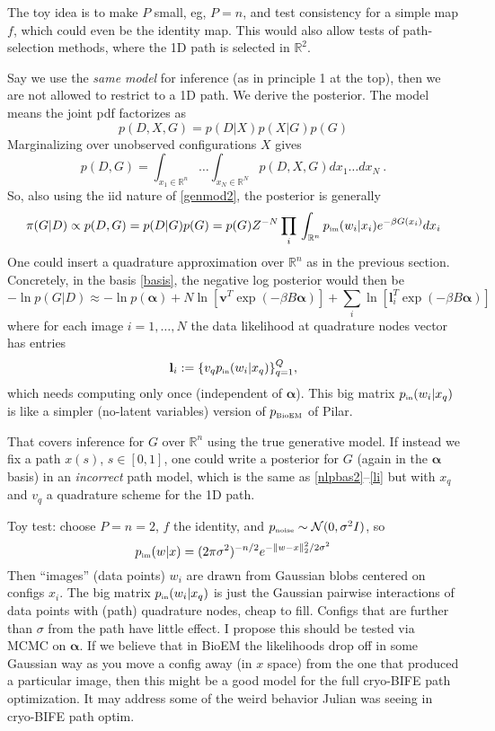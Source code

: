 \documentclass[10pt]{article}
\newcommand{\be}{\begin{equation}}
\newcommand{\ee}{\end{equation}}
\newcommand{\tbox}[1]{{\mbox{\tiny #1}}}
\newcommand{\mbf}[1]{{\mathbf #1}}
\newcommand{\R}{\mathbb{R}}
\newcommand{\bt}{\beta}
\newcommand{\bal}{{\bm\alpha}}
\begin{document}
The toy idea is to make $P$ small, eg, $P=n$, and test
consistency for a simple map $f$, which could even be the identity map.
This would also allow tests of path-selection methods, where
the 1D path is selected in $\R^2$.

Say we use the {\em same model} for inference
(as in principle 1 at the top),
then we are not allowed to restrict to a 1D path.
We derive the posterior.
The model means the joint pdf factorizes as
\be
p(D,X,G) = p(D|X)p(X|G)p(G)
\label{joint}
\ee
Marginalizing over unobserved configurations $X$ gives
\be
p(D,G) = \int_{x_1\in\R^n}\dots \int_{x_N\in\R^N} p(D,X,G) dx_1\ldots dx_N ~.
\label{marg}
\ee
So, also using the iid nature of \eqref{genmod2}, the posterior is generally
$$
\pi(G|D) \propto p(D,G) = p(D|G)p(G) = p(G) Z^{-N} \prod_i \, \int_{\R^n} p_\tbox{im}(w_i | x_i)
e^{-\bt G(x_i)} dx_i
$$
One could insert a quadrature approximation over $\R^n$
as in the previous section.
Concretely, in the basis \eqref{basis},
the negative log posterior would then be
\be
- \ln p(G|D) \approx
- \ln p(\bal)
+
N \ln [\mbf{v}^T \exp (-\bt B \bal)]
+
\sum_i \ln [\mbf{l}^T_i \exp (-\bt B \bal)]
\label{nlpbas2}
\ee
where for each image $i=1,\dots,N$ the data likelihood at quadrature nodes
vector has entries
\be
\mbf{l}_i := \{v_q p_\tbox{in}(w_i | x_q)\}_{q=1}^Q,
\label{li}
\ee
which needs computing only once (independent of $\bal$).
This big matrix $p_\tbox{in}(w_i | x_q)$ is like a simpler (no-latent variables)
version of $p_\tbox{BioEM}$ of Pilar.

That covers inference for $G$ over $\R^n$ using the true generative model. If instead
we fix a path $x(s)$, $s\in[0,1]$, one could write a posterior
for $G$ (again in the $\bal$ basis) in an {\em incorrect} path model,
which is the same as \eqref{nlpbas2}--\eqref{li}
but with $x_q$ and $v_q$ a quadrature scheme for the 1D path.

Toy test: choose $P=n=2$, $f$ the identity, and
$p_\tbox{noise} \sim {\cal N} (0,\sigma^2 I)$,
so
$$
p_\tbox{im}(w|x) = (2\pi\sigma^2)^{-n/2} e^{-\|w-x\|^2_2/2\sigma^2}
$$
Then ``images'' (data points) $w_i$ are
drawn from Gaussian blobs centered on configs $x_i$.
The big matrix $p_\tbox{in}(w_i | x_q)$ is just the Gaussian pairwise
interactions of data points with (path) quadrature nodes, cheap to fill.
Configs that are further than $\sigma$ from the path have little effect.
I propose this should be tested via MCMC on $\bal$.
If we believe that in BioEM the likelihoods drop off in some Gaussian way
as you move a config away (in $x$ space) from the one that produced a
particular image, then this might be a good model for the full cryo-BIFE
path optimization.
It may address some of the weird behavior
Julian was seeing in cryo-BIFE path optim.
\end{document}
